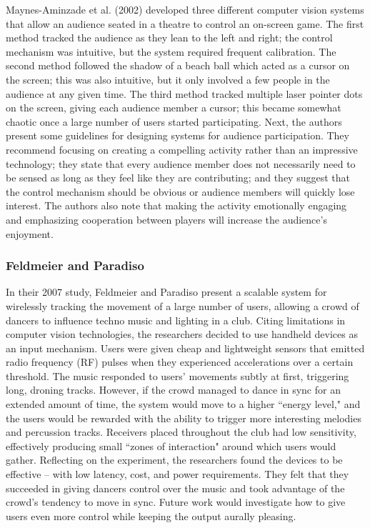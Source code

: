 Maynes-Aminzade et al. (2002) developed three different computer vision systems that allow an audience seated in a theatre to control an on-screen game. The first method tracked the audience as they lean to the left and right; the control mechanism was intuitive, but the system required frequent calibration. The second method followed the shadow of a beach ball which acted as a cursor on the screen; this was also intuitive, but it only involved a few people in the audience at any given time. The third method tracked multiple laser pointer dots on the screen, giving each audience member a cursor; this became somewhat chaotic once a large number of users started participating. Next, the authors present some guidelines for designing systems for audience participation. They recommend focusing on creating a compelling activity rather than an impressive technology; they state that every audience member does not necessarily need to be sensed as long as they feel like they are contributing; and they suggest that the control mechanism should be obvious or audience members will quickly lose interest. The authors also note that making the activity emotionally engaging and emphasizing cooperation between players will increase the audience's enjoyment.

\subsubsection{Feldmeier and Paradiso}

In their 2007 study, Feldmeier and Paradiso present a scalable system for wirelessly tracking the movement of a large number of users, allowing a crowd of dancers to influence techno music and lighting in a club. Citing limitations in computer vision technologies, the researchers decided to use handheld devices as an input mechanism. Users were given cheap and lightweight sensors that emitted radio frequency (RF) pulses when they experienced accelerations over a certain threshold. The music responded to users' movements subtly at first, triggering long, droning tracks. However, if the crowd managed to dance in sync for an extended amount of time, the system would move to a higher ``energy level," and the users would be rewarded with the ability to trigger more interesting melodies and percussion tracks. Receivers placed throughout the club had low sensitivity, effectively producing small ``zones of interaction" around which users would gather. Reflecting on the experiment, the researchers found the devices to be effective -- with low latency, cost, and power requirements. They felt that they succeeded in giving dancers control over the music and took advantage of the crowd's tendency to move in sync. Future work would investigate how to give users even more control while keeping the output aurally pleasing.

